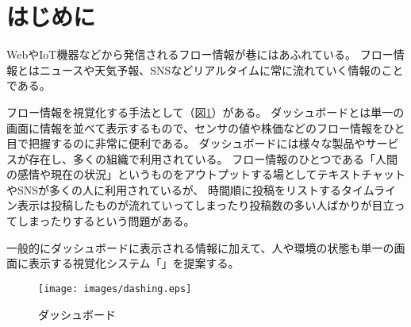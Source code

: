 \section{はじめに}

WebやIoT機器などから発信されるフロー情報が巷にはあふれている。
フロー情報とはニュースや天気予報、SNSなどリアルタイムに常に流れていく情報のことである。

フロー情報を視覚化する手法として（図\ref{dashing}）がある。
ダッシュボードとは単一の画面に情報を並べて表示するもので、センサの値や株価などのフロー情報をひと目で把握するのに非常に便利である。
ダッシュボードには様々な製品やサービスが存在し、多くの組織で利用されている。
フロー情報のひとつである「人間の感情や現在の状況」というものをアウトプットする場としてテキストチャットやSNSが多くの人に利用されているが、
時間順に投稿をリストするタイムライン表示は投稿したものが流れていってしまったり投稿数の多い人ばかりが目立ってしまったりするという問題がある。

一般的にダッシュボードに表示される情報に加えて、人や環境の状態も単一の画面に表示する視覚化システム「」を提案する。

\begin{figure}[h]
\centering
\texttt{[image: images/dashing.eps]}
\caption{ダッシュボード}
\label{dashing}
\end{figure}